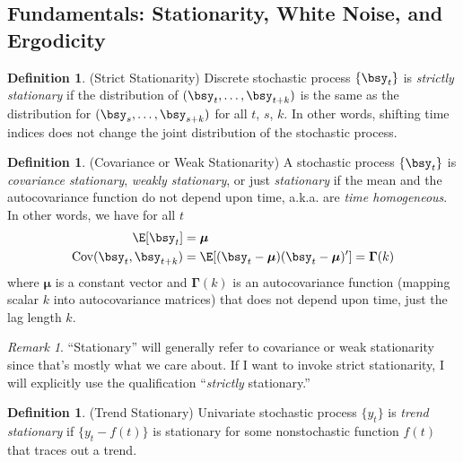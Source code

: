 \documentclass[12pt]{article}
\theoremstyle{plain}
\theoremstyle{definition}
\newtheorem{defn}[thm]{Definition}
\theoremstyle{remark}
\newtheorem*{rmk}{Remark}
\newcommand{\bsmu}{\boldsymbol{\mu}}
\newcommand{\bsGamma}{\boldsymbol{\Gamma}}
\newcommand{\Cov}{\operatorname{Cov}}
\begin{document}


\subsection{Fundamentals: Stationarity, White Noise, and Ergodicity}

\begin{defn}(Strict Stationarity)
Discrete stochastic process $\{\bsy_t\}$ is \emph{strictly stationary} if
the distribution of $(\bsy_t,\ldots,\bsy_{t+k})$ is the same as the
distribution for $(\bsy_s,\ldots,\bsy_{s+k})$ for all $t$, $s$, $k$.
In other words, shifting time indices does not change the joint
distribution of the stochastic process.
\end{defn}

\begin{defn}(Covariance or Weak Stationarity)
A stochastic process $\{\bsy_t\}$ is \emph{covariance stationary},
\emph{weakly stationary}, or just \emph{stationary} if the mean and the
autocovariance function do not depend upon time, a.k.a. are
\emph{time homogeneous}.
In other words, we have for all $t$
\begin{align*}
  \E[\bsy_t] &= \bsmu \\
  \Cov(\bsy_t,\bsy_{t+k}) &=
  \E[(\bsy_t-\bsmu)(\bsy_t-\bsmu)']
  = \bsGamma(k)
\end{align*}
where $\bsmu$ is a constant vector and $\bsGamma(k)$ is an
autocovariance function (mapping scalar $k$ into autocovariance
matrices) that does not depend upon time, just the lag length $k$.
\end{defn}
\begin{rmk}
``Stationary'' will generally refer to covariance or weak stationarity
since that's mostly what we care about. If I want to invoke strict
stationarity, I will explicitly use the qualification ``\emph{strictly}
stationary.''
\end{rmk}

\begin{defn}(Trend Stationary)
Univariate stochastic process $\{y_t\}$ is \emph{trend stationary} if
$\{y_t-f(t)\}$ is stationary for some nonstochastic function $f(t)$ that
traces out a trend.
\end{defn}
\end{document}
